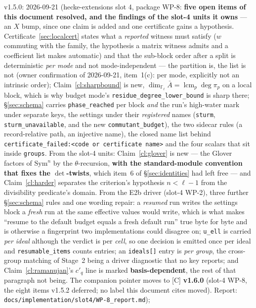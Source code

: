 \documentclass[11pt]{article}
\theoremstyle{remark}
\newcommand{\F}{\mathbb{F}}
\newcommand{\Sym}{\mathrm{Sym}}
\newcommand{\Fl}{\F_\ell}
\begin{document}
v1.5.0: 2026-09-21 (hecke-extensions slot 4, package WP-8: \textbf{five
open items of this document resolved, and the findings of the slot-4 units it owns} --- an
$X$ bump, since one claim is added and one certificate gains a hypothesis.
Certificate~\ref{sec:localcert} states what a \emph{reported} witness must satisfy
($w$ commuting with the family, the hypothesis a matrix witness admits and a coefficient
list makes automatic) and that the sub-block order after a split is deterministic
\emph{per mode} and not mode-independent --- the partition is, the list is not (owner
confirmation of 2026-09-21, item~1(c): per mode, explicitly not an intrinsic order);
Claim~\ref{cl:sharpbound} is new, $\dim_{\Fl}\bar A=\operatorname{lcm}_p\deg\pi_p$ on a
local block, which is why budget mode's \texttt{residue\_degree\_lower\_bound} is sharp
there; \S\ref{sec:schema} carries \texttt{phase\_reached} per block \emph{and} the run's
high-water mark under separate keys, the settings under their \emph{registered} names
(\texttt{sturm}, \texttt{sturm\_unavailable}, and the new \texttt{commutant\_budget}), the
two sidecar rules (a record-relative path, an injective name), the closed name list behind
\texttt{certificate\_failed:<code or certificate name>} and the four scalars that sit
inside \texttt{groups}. From the slot-4 units: Claim~\ref{cl:glover} is new --- the Glover
factors of $\Sym^n$ by the $\theta$-recursion, \textbf{with the standard-module convention
that fixes the $\det$-twists}, which item~6 of \S\ref{sec:identities} had left free --- and
Claim~\ref{cl:harder} separates the criterion's hypothesis $n<\ell-1$ from the
divisibility predicate's domain. From the E2b driver (slot-4 WP-2), three further
\S\ref{sec:schema} rules and one wording repair: a \emph{resumed} run writes the settings
block a \emph{fresh} run at the same effective values would write, which is what makes
``resume to the default budget equals a fresh default run'' true byte for byte and is
otherwise a fingerprint two implementations could disagree on; \texttt{u\_ell} is carried
\emph{per ideal} although the verdict is per \emph{cell}, so one decision is emitted once
per ideal and \texttt{resumable\_items} counts entries; an \texttt{ideals[]} entry is
\emph{per group}, the cross-group matching of Stage~2 being a driver diagnostic that no key
reports; and Claim~\ref{cl:ramanujan}'s $c'_q$ line is marked \textbf{basis-dependent},
the rest of that paragraph not being. The companion pointer moves to [C] \textbf{v1.6.0}
(slot-4 WP-8, the eight items v1.5.2 deferred; no label this document cites moved).
Report: \texttt{docs/implementation/slot4/WP-8\_report.md});
\end{document}

